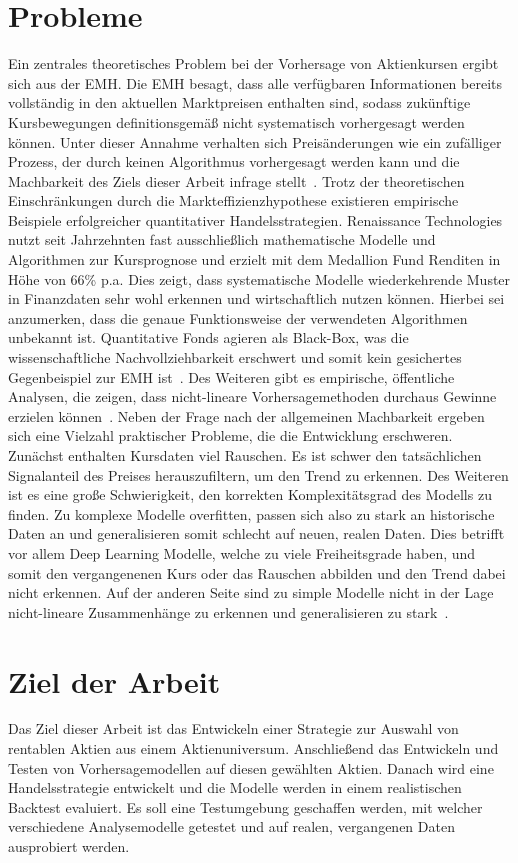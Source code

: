 \section{Probleme}\label{sec:probleme}
Ein zentrales theoretisches Problem bei der Vorhersage von Aktienkursen ergibt sich aus der \ac{EMH}. Die \ac{EMH} besagt, dass alle verfügbaren Informationen bereits vollständig in den aktuellen Marktpreisen enthalten sind, sodass zukünftige Kursbewegungen definitionsgemäß nicht systematisch vorhergesagt werden können. Unter dieser Annahme verhalten sich Preisänderungen wie ein zufälliger Prozess, der durch keinen Algorithmus vorhergesagt werden kann und die Machbarkeit des Ziels dieser Arbeit infrage stellt~\cite{malkiel1989efficient}.
Trotz der theoretischen Einschränkungen durch die Markteffizienzhypothese existieren empirische Beispiele erfolgreicher quantitativer Handelsstrategien. Renaissance Technologies nutzt seit Jahrzehnten fast ausschließlich mathematische Modelle und Algorithmen zur Kursprognose und erzielt mit dem Medallion Fund Renditen in Höhe von 66\% p.a. Dies zeigt, dass systematische Modelle wiederkehrende Muster in Finanzdaten sehr wohl erkennen und wirtschaftlich nutzen können. Hierbei sei anzumerken, dass die genaue Funktionsweise der verwendeten Algorithmen unbekannt ist. Quantitative Fonds agieren als \glqq{}Black-Box\grqq, was die wissenschaftliche Nachvollziehbarkeit erschwert und somit kein gesichertes Gegenbeispiel zur \ac{EMH} ist~\cite{burton2016inside}. Des Weiteren gibt es empirische, öffentliche Analysen, die zeigen, dass nicht-lineare Vorhersagemethoden durchaus Gewinne erzielen können~\cite{Sewell2012_EMH}.
Neben der Frage nach der allgemeinen Machbarkeit ergeben sich eine Vielzahl praktischer Probleme, die die Entwicklung erschweren. Zunächst enthalten Kursdaten viel Rauschen. Es ist schwer den tatsächlichen Signalanteil des Preises herauszufiltern, um den Trend zu erkennen. Des Weiteren ist es eine große Schwierigkeit, den korrekten Komplexitätsgrad des Modells zu finden. Zu komplexe Modelle \glqq{}overfitten\grqq, passen sich also zu stark an historische Daten an und generalisieren somit schlecht auf neuen, realen Daten. Dies betrifft vor allem Deep Learning Modelle, welche zu viele Freiheitsgrade haben, und somit den vergangenenen Kurs oder das Rauschen abbilden und den Trend dabei nicht erkennen. Auf der anderen Seite sind zu simple Modelle nicht in der Lage nicht-lineare Zusammenhänge zu erkennen und generalisieren zu stark~\cite{PrakashTuoDing2023_temporalOverfitting}.

\section{Ziel der Arbeit}\label{sec:ziel_der_arbeit}
Das Ziel dieser Arbeit ist das Entwickeln einer Strategie zur Auswahl von rentablen Aktien aus einem Aktienuniversum. Anschließend das Entwickeln und Testen von Vorhersagemodellen auf diesen gewählten Aktien. Danach wird eine Handelsstrategie entwickelt und die Modelle werden in einem realistischen Backtest evaluiert. Es soll eine Testumgebung geschaffen werden, mit welcher verschiedene Analysemodelle getestet und auf realen, vergangenen Daten ausprobiert werden.

